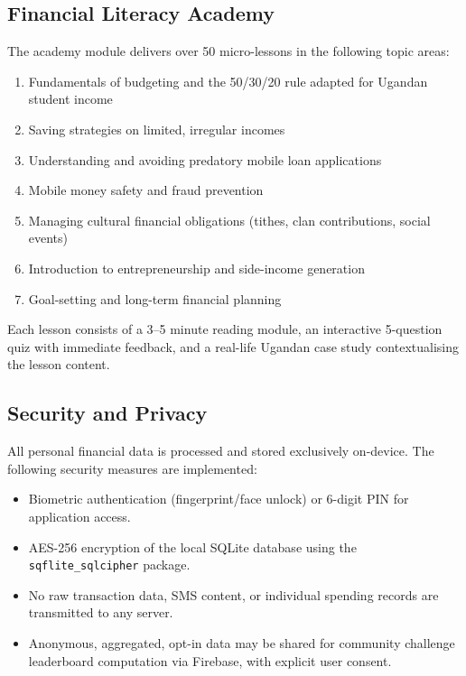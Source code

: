 \documentclass[12pt,a4paper]{report}
\begin{document}
\subsection{Financial Literacy Academy}

The academy module delivers over 50 micro-lessons in the following topic areas:

\begin{enumerate}
    \item Fundamentals of budgeting and the 50/30/20 rule adapted for Ugandan student income
    \item Saving strategies on limited, irregular incomes
    \item Understanding and avoiding predatory mobile loan applications
    \item Mobile money safety and fraud prevention
    \item Managing cultural financial obligations (tithes, clan contributions, social events)
    \item Introduction to entrepreneurship and side-income generation
    \item Goal-setting and long-term financial planning
\end{enumerate}

Each lesson consists of a 3--5 minute reading module, an interactive 5-question quiz
with immediate feedback, and a real-life Ugandan case study contextualising the lesson
content.

\subsection{Security and Privacy}

All personal financial data is processed and stored exclusively on-device. The
following security measures are implemented:

\begin{itemize}
    \item Biometric authentication (fingerprint/face unlock) or 6-digit PIN for application access.
    \item AES-256 encryption of the local SQLite database using the \texttt{sqflite\_sqlcipher} package.
    \item No raw transaction data, SMS content, or individual spending records are transmitted to any server.
    \item Anonymous, aggregated, opt-in data may be shared for community challenge leaderboard computation via Firebase, with explicit user consent.
\end{itemize}
\end{document}
